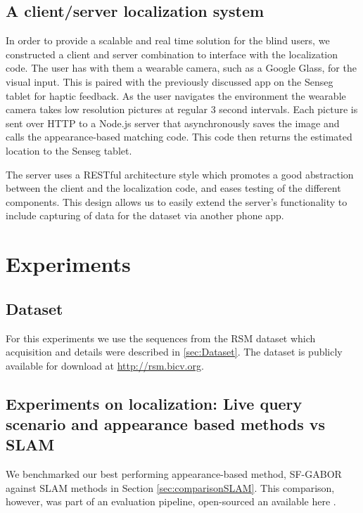 \subsection{A client/server localization system}
\label{sec:5}

In order to provide a scalable and real time solution for the blind users, we constructed a client and server combination to interface with the localization code.
The user has with them a wearable camera, such as a Google Glass, for the visual input. This is paired with the previously discussed app on the Senseg tablet for haptic feedback.
As the user navigates the environment the wearable camera takes low resolution pictures at regular 3 second intervals.
Each picture is sent over HTTP to a Node.js server that asynchronously saves the image and calls the appearance-based matching code.
This code then returns the estimated location to the Senseg tablet.

The server uses a RESTful architecture style \citep{Fielding:2000:PDM:337180.337228} which promotes a good abstraction between the client and the localization code, and eases testing of the different components.
This design allows us to easily extend the server's functionality to include capturing of data for the dataset via another phone app.

\section{Experiments}
\label{sec:experiments}

\subsection{Dataset}
For this experiments we use the sequences from the RSM dataset which acquisition and details were described in \ref{sec:Dataset}. The dataset is publicly available for download at \url{http://rsm.bicv.org}.


\subsection{Experiments on localization: Live query scenario and appearance based methods vs SLAM}

We benchmarked our best performing appearance-based method, SF-GABOR against SLAM methods in Section \ref{sec:comparisonSLAM}. This comparison, however, was part of an evaluation pipeline, open-sourced an available here \cite{RiveraLocEvalCode}.

